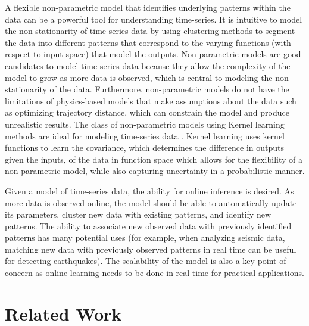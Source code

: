 \documentclass{article}
\begin{document}
A flexible non-parametric model that identifies underlying patterns within the data can be a powerful tool for understanding time-series. It is intuitive to model the non-stationarity of time-series data by using clustering methods to segment the data into different patterns that correspond to the varying functions (with respect to input space) that model the outputs. Non-parametric models are good candidates to model time-series data because they allow the complexity of the model to grow as more data is observed, which is central to modeling the non-stationarity of the data. Furthermore, non-parametric models do not have the limitations of physics-based models that make assumptions about the data such as optimizing trajectory distance, which can constrain the model and produce unrealistic results. The class of non-parametric models using Kernel learning methods are ideal for modeling time-series data \citep{GPML}. Kernel learning uses kernel functions to learn the covariance, which determines the difference in outputs given the inputs, of the data in function space which allows for the flexibility of a non-parametric model, while also capturing uncertainty in a probabilistic manner. 

Given a model of time-series data, the ability for online inference is desired. As more data is observed online, the model should be able to automatically update its parameters, cluster new data with existing patterns, and identify new patterns. The ability to associate new observed data with previously identified patterns has many potential uses (for example, when analyzing seismic data, matching new data with previously observed patterns in real time can be useful for detecting earthquakes). The scalability of the model is also a key point of concern as online learning needs to be done in real-time for practical applications. 

\section{Related Work} 
 
\end{document}
